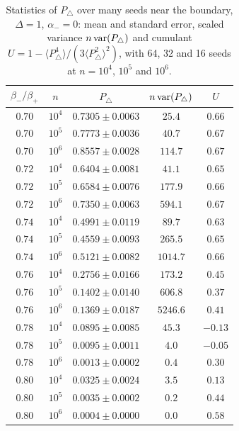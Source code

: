 \documentclass[aps,pre,twocolumn,superscriptaddress,floatfix,nofootinbib]{revtex4-2}
\begin{document}
\begin{table}[t]
\caption{Statistics of $P_\triangle$ over many seeds near the boundary,
$\Delta=1$, $\alpha_-=0$: mean and standard error, scaled variance
$n\,{\rm var}(P_\triangle)$ and cumulant $U=1-\langle P_\triangle^4\rangle/(3\langle P_\triangle^2\rangle^2)$,
with 64, 32 and 16 seeds at $n=10^4$, $10^5$ and $10^6$.}
\label{tab:seeds}
\begin{ruledtabular}
\begin{tabular}{ccccc}
$\beta_-/\beta_+$ & $n$ & $P_\triangle$ & $n\,{\rm var}(P_\triangle)$ & $U$\\
\hline
$0.70$ & $10^4$ & $0.7305\pm0.0063$ & $25.4$ & $0.66$\\
$0.70$ & $10^5$ & $0.7773\pm0.0036$ & $40.7$ & $0.67$\\
$0.70$ & $10^6$ & $0.8557\pm0.0028$ & $114.7$ & $0.67$\\
$0.72$ & $10^4$ & $0.6404\pm0.0081$ & $41.1$ & $0.65$\\
$0.72$ & $10^5$ & $0.6584\pm0.0076$ & $177.9$ & $0.66$\\
$0.72$ & $10^6$ & $0.7350\pm0.0063$ & $594.1$ & $0.67$\\
$0.74$ & $10^4$ & $0.4991\pm0.0119$ & $89.7$ & $0.63$\\
$0.74$ & $10^5$ & $0.4559\pm0.0093$ & $265.5$ & $0.65$\\
$0.74$ & $10^6$ & $0.5121\pm0.0082$ & $1014.7$ & $0.66$\\
$0.76$ & $10^4$ & $0.2756\pm0.0166$ & $173.2$ & $0.45$\\
$0.76$ & $10^5$ & $0.1402\pm0.0140$ & $606.8$ & $0.37$\\
$0.76$ & $10^6$ & $0.1369\pm0.0187$ & $5246.6$ & $0.41$\\
$0.78$ & $10^4$ & $0.0895\pm0.0085$ & $45.3$ & $-0.13$\\
$0.78$ & $10^5$ & $0.0095\pm0.0011$ & $4.0$ & $-0.05$\\
$0.78$ & $10^6$ & $0.0013\pm0.0002$ & $0.4$ & $0.30$\\
$0.80$ & $10^4$ & $0.0325\pm0.0024$ & $3.5$ & $0.13$\\
$0.80$ & $10^5$ & $0.0035\pm0.0002$ & $0.2$ & $0.44$\\
$0.80$ & $10^6$ & $0.0004\pm0.0000$ & $0.0$ & $0.58$\\
\end{tabular}
\end{ruledtabular}
\end{table}
\end{document}
